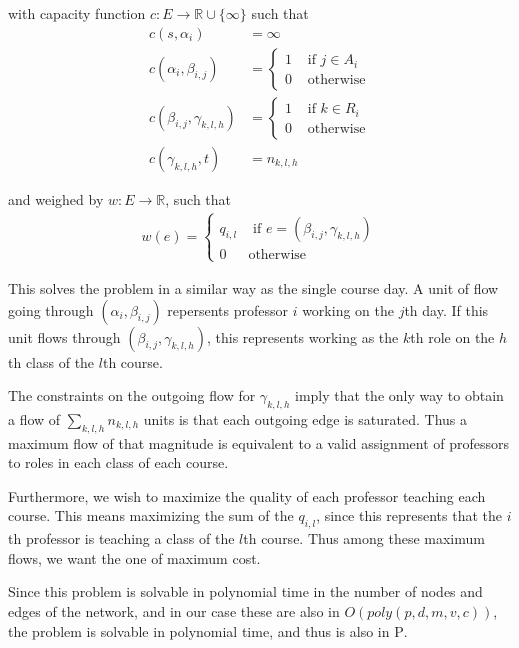 with capacity function $c:E \to \mathbb{R} \cup \{\infty\}$ such that
\begin{align*}
  c(s, \alpha_i) &= \infty\\
  c(\alpha_i, \beta_{i, j}) &= \begin{cases}
  1 &\text{ if } j \in A_i\\
  0 &\text{ otherwise}
\end{cases}\\
  c(\beta_{i, j}, \gamma_{k, l, h}) &= \begin{cases}
  1 & \text{ if } k \in R_i\\
  0 & \text{ otherwise}
\end{cases}\\
  c(\gamma_{k, l, h}, t) &= n_{k, l, h}
\end{align*}

and weighed by $w:E \to \mathbb{R}$, such that
\begin{align*}
  w(e) = \begin{cases}
    q_{i, l} & \text{ if } e = (\beta_{i, j}, \gamma_{k, l, h})\\
    0 & \text{otherwise}
  \end{cases}
\end{align*}

This solves the problem in a similar way as the single course day. A unit of flow going through $(\alpha_i, \beta_{i, j})$ repersents professor $i$ working on the $j$th day. If this unit flows through $(\beta_{i, j}, \gamma_{k, l, h})$, this represents working as the $k$th role on the $h$th class of the $l$th course.

The constraints on the outgoing flow for $\gamma_{k, l, h}$ imply that the only way to obtain a flow of $\sum_{k, l, h} n_{k, l, h}$ units is that each outgoing edge is saturated. Thus a maximum flow of that magnitude is equivalent to a valid assignment of professors to roles in each class of each course.

Furthermore, we wish to maximize the quality of each professor teaching each course. This means maximizing the sum of the $q_{i, l}$, since this represents that the $i$th professor is teaching a class of the $l$th course. Thus among these maximum flows, we want the one of maximum cost.

Since this problem is solvable in polynomial time in the number of nodes and edges of the network, and in our case these are also in $O(poly(p, d, m, v, c))$, the problem is solvable in polynomial time, and thus is also in \textsc{P}.


